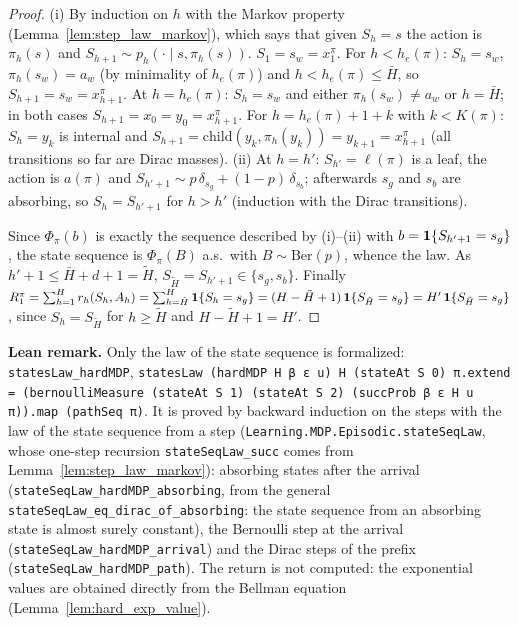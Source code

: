 \begin{proof}
\leanok
{}
(i) By induction on $h$ with the Markov property (Lemma~\ref{lem:step_law_markov}), which says
that given $S_h = s$ the action is $\pi_h(s)$ and $S_{h+1} \sim p_h(\cdot \mid s, \pi_h(s))$.
$S_1 = s_w = x^\pi_1$. For $h < h_e(\pi)$: $S_h = s_w$, $\pi_h(s_w) = a_w$ (by minimality of
$h_e(\pi)$) and $h < h_e(\pi) \le \bar H$, so $S_{h+1} = s_w = x^\pi_{h+1}$. At $h = h_e(\pi)$:
$S_h = s_w$ and either $\pi_h(s_w) \ne a_w$ or $h = \bar H$; in both cases
$S_{h+1} = x_0 = y_0 = x^\pi_{h+1}$. For $h = h_e(\pi) + 1 + k$ with $k < K(\pi)$: $S_h = y_k$ is
internal and $S_{h+1} = \mathrm{child}(y_k, \pi_h(y_k)) = y_{k+1} = x^\pi_{h+1}$ (all transitions
so far are Dirac masses). (ii) At $h = h'$: $S_{h'} = \ell(\pi)$ is a leaf, the action is
$a(\pi)$ and $S_{h'+1} \sim p\,\delta_{s_g} + (1-p)\,\delta_{s_b}$; afterwards $s_g$ and $s_b$
are absorbing, so $S_h = S_{h'+1}$ for $h > h'$ (induction with the Dirac transitions).

Since $\Phi_\pi(b)$ is exactly the sequence described by (i)--(ii) with $b = \mathbf{1}\{S_{h'+1} = s_g\}$,
the state sequence is $\Phi_\pi(B)$ a.s.\ with $B \sim \mathrm{Ber}(p)$, whence the law. As
$h' + 1 \le \bar H + d + 1 = \tilde H$, $S_{\tilde H} = S_{h'+1} \in \{s_g, s_b\}$. Finally
$R^\pi_1 = \sum_{h=1}^H r_h(S_h, A_h) = \sum_{h=\tilde H}^{H}\mathbf{1}\{S_h = s_g\}
= (H - \tilde H + 1)\,\mathbf{1}\{S_{\tilde H} = s_g\} = H'\,\mathbf{1}\{S_{\tilde H} = s_g\}$, since
$S_h = S_{\tilde H}$ for $h \ge \tilde H$ and $H - \tilde H + 1 = H'$.
\end{proof}

\textbf{Lean remark.} Only the law of the state sequence is formalized:
\texttt{statesLaw\_hardMDP}, \texttt{statesLaw (hardMDP H β ε u) H (stateAt S 0) π.extend = (bernoulliMeasure (stateAt S 1) (stateAt S 2) (succProb β ε H u π)).map (pathSeq π)}.
It is proved by backward induction on the steps with the law of the state sequence from a step
(\texttt{Learning.MDP.Episodic.stateSeqLaw}, whose one-step recursion \texttt{stateSeqLaw\_succ} comes
from Lemma~\ref{lem:step_law_markov}): absorbing states after the arrival
(\texttt{stateSeqLaw\_hardMDP\_absorbing}, from the general
\texttt{stateSeqLaw\_eq\_dirac\_of\_absorbing}: the state sequence from an absorbing state is
almost surely constant), the Bernoulli step at the arrival
(\texttt{stateSeqLaw\_hardMDP\_arrival}) and the Dirac steps of the prefix
(\texttt{stateSeqLaw\_hardMDP\_path}). The return is not computed: the exponential values are obtained
directly from the Bellman equation (Lemma~\ref{lem:hard_exp_value}).

